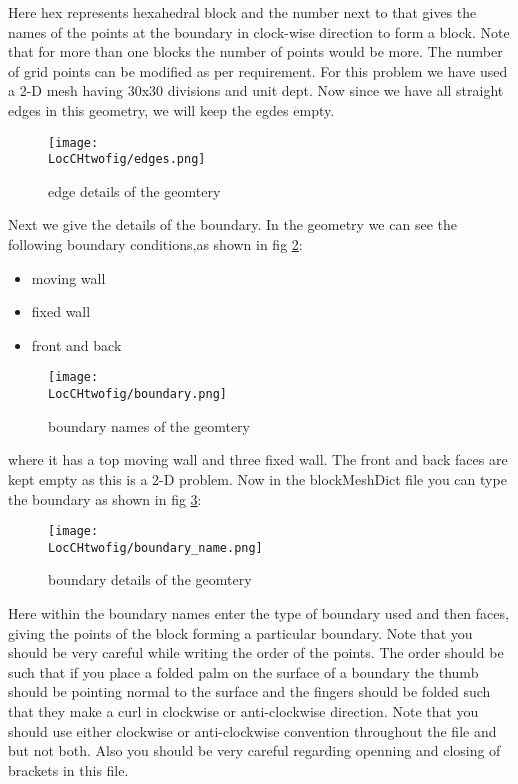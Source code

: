 \flushleft Here hex represents hexahedral block and the number next to that gives the names of the points at the boundary in clock-wise direction to form a block. Note that for more than one blocks the number of points would be more. The number of grid points can be modified as per requirement. For this problem we have used a 2-D mesh having 30x30 divisions and unit dept. Now since we have all straight edges in this geometry, we will keep the egdes empty.

\begin{figure}[ht]  
\begin{center}  
\texttt{[image: \\LocCHtwofig/edges.png]}
\caption{edge details of the geomtery}
\label{edges}
\end{center}  
\end{figure}
\vspace{2cm}
\flushleft Next we give the details of the boundary. In the geometry we can see the following boundary conditions,as shown in fig \ref{boundary}:
\begin{itemize}
  \item moving wall
  \item fixed wall
  \item front and back
\end{itemize}
\begin{figure}[ht]  
\begin{center}  
\texttt{[image: \\LocCHtwofig/boundary.png]}
\caption{boundary names of the geomtery}
\label{boundary}
\end{center}  
\end{figure}
\flushleft where it has a top moving wall and three fixed wall. The front and back faces are kept empty as this is a 2-D problem. 
\vspace{10cm}
\flushleft Now in the blockMeshDict file you can type the boundary as shown in fig \ref{boundary_name}:
\begin{figure}[ht]  
\begin{center}  
\texttt{[image: \\LocCHtwofig/boundary\_name.png]}
\caption{boundary details of the geomtery}
\label{boundary_name}
\end{center}  
\end{figure}


\flushleft Here within the boundary names enter the type of boundary used and  then faces, giving the points of the block forming a particular boundary. Note that you should be very careful while writing the order of the points. The order should be such that if you place a folded palm on the surface of a boundary the thumb should be pointing normal to the surface and the fingers should be folded such that they make a curl in clockwise or anti-clockwise direction. Note that you should use either clockwise or anti-clockwise convention throughout the file and but not both. Also you should be very careful regarding openning and closing of brackets in this file.

